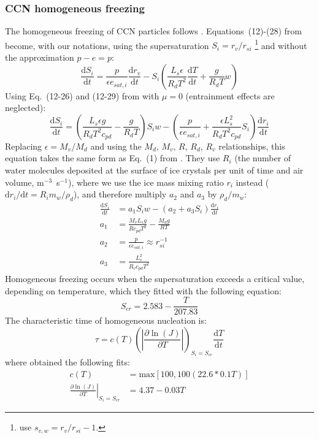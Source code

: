 \subsubsection{CCN homogeneous freezing}

The homogeneous freezing of CCN particles follows \citet{Karcher2002}. Equations\ (12)-(28) from \citet{Pruppacher1997} become, with our notations, using the supersaturation $S_i = r_v / r_{si}$ \footnote{\citet{Pruppacher1997} use $s_{v,w}=r_v / r_{si} -1$.} and without the approximation $p-e = p$:
\begin{equation}
 \frac{\mathrm{d}S_i}{\mathrm{d}t} = \frac{p}{\epsilon e_{sat,i}} \frac{\mathrm{d}r_v}{\mathrm{d}t} - S_i \left( \frac{L_s \epsilon}{R_d T^2} \frac{\mathrm{d}T}{\mathrm{d}t} + \frac{g}{R_d T} w \right) 
\end{equation}
Using Eq.\ (12-26) and (12-29) from \citet{Pruppacher1997} with $\mu=0$ (entrainment effects are neglected):
\begin{equation}
 \frac{\mathrm{d}S_i}{\mathrm{d}t} = \left( \frac{L_s \epsilon g}{R_d T^2 c_{pd}} - \frac{g}{R_d T} \right) S_i w - \left( \frac{p}{\epsilon e_{sat,i}} + \frac{\epsilon L_s^2}{R_d T^2 c_{pd}} S_i\right) \frac{\mathrm{d}r_i}{\mathrm{d}t}
\end{equation}
Replacing $\epsilon = M_v / M_d$ and using the $M_d$, $M_v$, $R$, $R_d$, $R_v$ relationships, this equation takes the same form as Eq.\ (1) from \citet{Karcher2002}. They use $R_i$ (the number of water molecules deposited at the surface of ice crystals per unit of time and air volume, m$^{-3}$~s$^{-1}$), where we use the ice mass mixing ratio $r_i$ instead ($\mathrm{d}r_i/\mathrm{d}t = R_i m_w / \rho_d$), and therefore multiply $a_2$ and $a_3$ by $\rho_d / m_w$:
\begin{align}
 \frac{\mathrm{d}S_i}{\mathrm{d}t} &=  a_1 S_i w - (a_2 + a_3 S_i) \frac{\mathrm{d}r_i}{\mathrm{d}t} \\
 a_1 &= \frac{M_v L_s g}{R c_{pd} T^2} - \frac{M_d g}{R T} \\
 a_2 &= \frac{p}{\epsilon e_{sat,i}} \approx r_{si}^{-1}\\
 a_3 &= \frac{L_s^2}{R_v c_{pd} T^2}
\end{align}
Homogeneous freezing occurs when the supersaturation exceeds a critical value, depending on temperature, which they fitted with the following equation:
\begin{equation}
 S_{cr} = 2.583 - \frac{T}{207.83}
\end{equation}
The characteristic time of homogeneous nucleation is:
\begin{equation}
 \tau = c(T) \left( \left|\frac{\partial \ln(J)}{\partial T}\right| \right)_{S_i=S_{cr}} \frac{\mathrm{d}T}{\mathrm{d}t}
\end{equation}
where \citet{Karcher2002} obtained the following fits:
\begin{align}
 c(T) &= \mathrm{max}[100,100(22.6*0.1T)] \\
 \left. \frac{\partial \ln(J)}{\partial T}\right|_{S_i=S_{cr}} &= 4.37-0.03T
\end{align}

